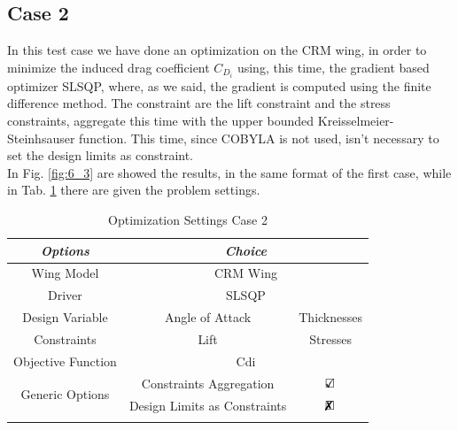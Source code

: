 \subsection{Case 2}
In this test case we have done an optimization on the CRM wing, in order to minimize the induced drag coefficient $C_{D_i}$ using, this time, the gradient based optimizer SLSQP, where, as we said, the gradient is computed using the finite difference method. The constraint are the lift constraint and the stress constraints, aggregate this time with the upper bounded Kreisselmeier-Steinhsauser function. This time, since COBYLA is not used, isn't necessary to set the design limits as constraint.\\
In Fig. \ref{fig:6_3} are showed the results, in the same format of the first case, while in Tab. \ref{tab:6_2} there are given the problem settings.
\begin{table}[H]
	\centering
	\begin{tabular}{ccc}
		\hline
		\multicolumn{1}{|c|}{\textit{Options}}                          & \multicolumn{2}{c|}{\textit{Choice}}                                               \\ \hline
		\multicolumn{1}{|c|}{Wing Model}                       & \multicolumn{2}{c|}{CRM Wing}                                                     \\ \hline
		\multicolumn{1}{|c|}{Driver}                           & \multicolumn{2}{c|}{SLSQP}                                                     \\ \hline
		\multicolumn{1}{|c|}{Design Variable}                  & \multicolumn{1}{c|}{Angle of Attack}&\multicolumn{1}{c|}{Thicknesses}                                                     \\ \hline
		\multicolumn{1}{|c|}{Constraints}                  & \multicolumn{1}{c|}{Lift }&\multicolumn{1}{c|}{Stresses}                                                     \\ \hline
		\multicolumn{1}{|c|}{Objective Function}               & \multicolumn{2}{c|}{Cdi}                                                     \\ \hline
		\multicolumn{1}{|c|}{\multirow{2}{*}{Generic Options}} & \multicolumn{1}{c|}{Constraints Aggregation}      & \multicolumn{1}{c|}{$\text{\rlap{$\checkmark$}}\square$} \\ \cline{2-3} 
		\multicolumn{1}{|c|}{}                                 & \multicolumn{1}{c|}{Design Limits as Constraints} & \multicolumn{1}{c|}{$\text{\rlap{$\xmark$}}\square$} \\ \hline
		&                                                   &                      
	\end{tabular}
	\caption{Optimization Settings Case 2}
	\label{tab:6_2}
\end{table}
